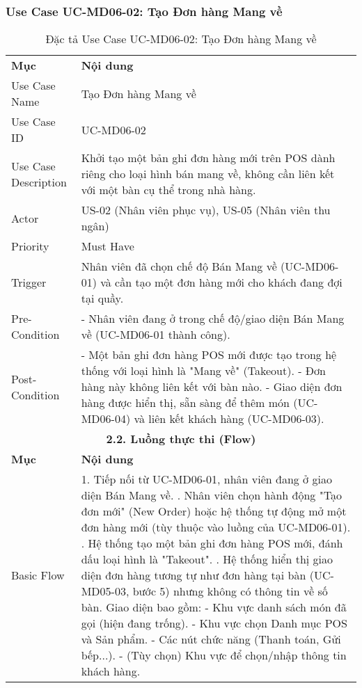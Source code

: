 \subsubsection{Use Case UC-MD06-02: Tạo Đơn hàng Mang về}

\begin{longtable}{|m{4cm}|p{11cm}|}
\caption{Đặc tả Use Case UC-MD06-02: Tạo Đơn hàng Mang về} \label{tab:uc_md06_02} \\
\hline

\endhead %
\hline
\endfoot %
\hline
\endlastfoot %
\multicolumn{2}{|c|}{\textbf{2.1. Tóm tắt (Summary)}} \\
\hline
\textbf{Mục} & \textbf{Nội dung} \\
\hline
Use Case Name & Tạo Đơn hàng Mang về \\
\hline
Use Case ID & UC-MD06-02 \\
\hline
Use Case Description & Khởi tạo một bản ghi đơn hàng mới trên POS dành riêng cho loại hình bán mang về, không cần liên kết với một bàn cụ thể trong nhà hàng. \\
\hline
Actor & US-02 (Nhân viên phục vụ), US-05 (Nhân viên thu ngân) \\
\hline
Priority & Must Have \\
\hline
Trigger & Nhân viên đã chọn chế độ Bán Mang về (UC-MD06-01) và cần tạo một đơn hàng mới cho khách đang đợi tại quầy. \\
\hline
Pre-Condition & - Nhân viên đang ở trong chế độ/giao diện Bán Mang về (UC-MD06-01 thành công). \\
\hline
Post-Condition & - Một bản ghi đơn hàng POS mới được tạo trong hệ thống với loại hình là "Mang về" (Takeout). \newline - Đơn hàng này không liên kết với bàn nào. \newline - Giao diện đơn hàng được hiển thị, sẵn sàng để thêm món (UC-MD06-04) và liên kết khách hàng (UC-MD06-03). \\
\hline
\multicolumn{2}{|c|}{\textbf{2.2. Luồng thực thi (Flow)}} \\
\hline
\textbf{Mục} & \textbf{Nội dung} \\
\hline
Basic Flow & 1. Tiếp nối từ UC-MD06-01, nhân viên đang ở giao diện Bán Mang về. \newline 2. Nhân viên chọn hành động "Tạo đơn mới" (New Order) hoặc hệ thống tự động mở một đơn hàng mới (tùy thuộc vào luồng của UC-MD06-01). \newline 3. Hệ thống tạo một bản ghi đơn hàng POS mới, đánh dấu loại hình là "Takeout". \newline 4. Hệ thống hiển thị giao diện đơn hàng tương tự như đơn hàng tại bàn (UC-MD05-03, bước 5) nhưng không có thông tin về số bàn. Giao diện bao gồm: \newline    - Khu vực danh sách món đã gọi (hiện đang trống). \newline    - Khu vực chọn Danh mục POS và Sản phẩm. \newline    - Các nút chức năng (Thanh toán, Gửi bếp...). \newline    - (Tùy chọn) Khu vực để chọn/nhập thông tin khách hàng. \\

\end{longtable}
